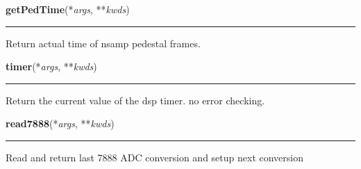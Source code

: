     \label{dsp:getPedTime}

    \vspace{0.5ex}

    \begin{boxedminipage}{\textwidth}

    \raggedright \textbf{getPedTime}(*\textit{args}, **\textit{kwds})

    \vspace{-1.5ex}

    \rule{\textwidth}{0.5\fboxrule}
    Return actual time of nsamp pedestal frames.

    \vspace{1ex}

    \end{boxedminipage}

    \label{dsp:timer}

    \vspace{0.5ex}

    \begin{boxedminipage}{\textwidth}

    \raggedright \textbf{timer}(*\textit{args}, **\textit{kwds})

    \vspace{-1.5ex}

    \rule{\textwidth}{0.5\fboxrule}
    Return the current value of the dsp timer. no error checking.

    \vspace{1ex}

    \end{boxedminipage}

    \label{dsp:read7888}

    \vspace{0.5ex}

    \begin{boxedminipage}{\textwidth}

    \raggedright \textbf{read7888}(*\textit{args}, **\textit{kwds})

    \vspace{-1.5ex}

    \rule{\textwidth}{0.5\fboxrule}
    Read and return last 7888 ADC conversion and setup next conversion

    \vspace{1ex}

    \end{boxedminipage}

